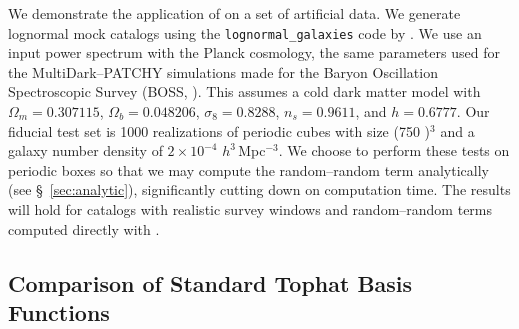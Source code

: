 We demonstrate the application of \est on a set of artificial data.
We generate lognormal mock catalogs \citep{ColesJones1991} using the \texttt{lognormal\_galaxies} code by \citep{Agrawal2017}.
We use an input power spectrum with the Planck cosmology, the same parameters used for the MultiDark--PATCHY simulations \citep{Kitaura2016} made for the Baryon Oscillation Spectroscopic Survey (BOSS, \citealt{Dawson2013}).
This assumes a cold dark matter model with $\Omega_m = 0.307115$, $\Omega_b = 0.048206$, $\sigma_8 = 0.8288$, $n_s = 0.9611$, and $h = 0.6777$.
Our fiducial test set is 1000 realizations of periodic cubes with size (750 \hmpc)$^3$ and a galaxy number density of $2 \times 10^{-4}$ $h^{3}\,$Mpc$^{-3}$.
We choose to perform these tests on periodic boxes so that we may compute the random--random term analytically (see \S~\ref{sec:analytic}), significantly cutting down on computation time.
The results will hold for catalogs with realistic survey windows and random--random terms computed directly with \est.

\subsection{Comparison of Standard Tophat Basis Functions}


